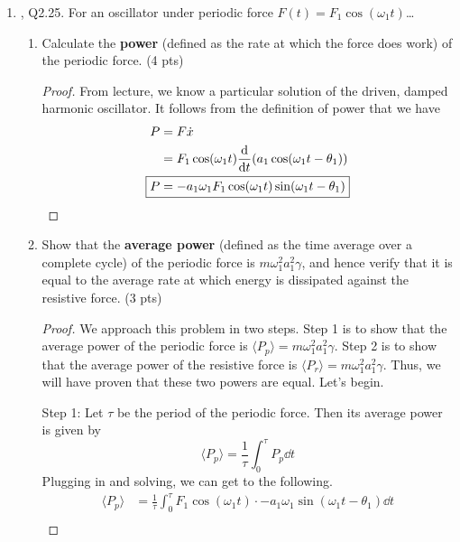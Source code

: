 \documentclass[../psets.tex]{subfiles}
\begin{document}
\begin{enumerate}
\begin{enumerate}
\begin{proof}
        \end{proof}
    \end{enumerate}
    \item \textcite{bib:KibbleBerkshire}, Q2.25. For an oscillator under periodic force $F(t)=F_1\cos(\omega_1t)$\dots
    \begin{enumerate}
        \item Calculate the \textbf{power} (defined as the rate at which the force does work) of the periodic force. (4 pts)
        \begin{proof}
            From lecture, we know a particular solution of the driven, damped harmonic oscillator. It follows from the definition of power that we have
            \begin{align*}
                P &= F\dot{x}\\
                &= F_1\cos(\omega_1t)\dv{t}(a_1\cos(\omega_1t-\theta_1))\\
                \Aboxed{P &= -a_1\omega_1F_1\cos(\omega_1t)\sin(\omega_1t-\theta_1)}
            \end{align*}
        \end{proof}
        \item Show that the \textbf{average power} (defined as the time average over a complete cycle) of the periodic force is $m\omega_1^2a_1^2\gamma$, and hence verify that it is equal to the average rate at which energy is dissipated against the resistive force. (3 pts)
        \begin{proof}
            We approach this problem in two steps. Step 1 is to show that the average power of the periodic force is $\langle P_p\rangle=m\omega_1^2a_1^2\gamma$. Step 2 is to show that the average power of the resistive force is $\langle P_r\rangle=m\omega_1^2a_1^2\gamma$. Thus, we will have proven that these two powers are equal. Let's begin.\par\smallskip
            Step 1: Let $\tau$ be the period of the periodic force. Then its average power is given by
            \begin{equation*}
                \langle P_p\rangle = \frac{1}{\tau}\int_0^\tau P_p\dd{t}
            \end{equation*}
            Plugging in and solving, we can get to the following.
            \begingroup
            \allowdisplaybreaks
            \begin{align*}
                \langle P_p\rangle &= \frac{1}{\tau}\int_0^\tau F_1\cos(\omega_1t)\cdot -a_1\omega_1\sin(\omega_1t-\theta_1)\dd{t}\\

\end{align*}
\end{proof}
\end{enumerate}
\end{enumerate}
\end{document}
